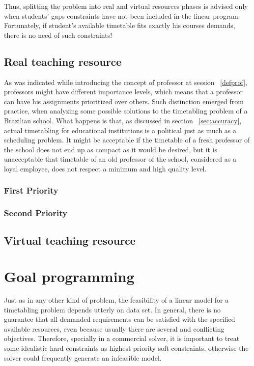 Thus, splitting the problem into real and virtual resources phases is advised only when students' gaps constraints have not been included in the linear program. Fortunately, if student's available timetable fits exactly his courses demands, there is no need of such constraints!


\subsection{Real teaching resource}

As was indicated while introducing the concept of professor at session ~\ref{defprof}, professors might have different importance levels, which means that a professor can have his assignments prioritized over others. Such distinction emerged from practice, when analyzing some possible solutions to the timetabling problem of a Brazilian school. What happens is that, as discussed in section ~\ref{sec:accuracy}, actual timetabling for educational institutions is a political just as much as a scheduling problem. It might be acceptable if the timetable of a fresh professor of the school does not end up as compact as it would be desired, but it is unacceptable that timetable of an old professor of the school, considered as a loyal employee, does not respect a minimum and high quality level.


\subsubsection{First Priority}

\subsubsection{Second Priority}


\subsection{Virtual teaching resource}




\section{Goal programming}

Just as in any other kind of problem, the feasibility of a linear model for a timetabling problem depends utterly on data set. In general, there is no guarantee that all demanded requirements can be satisfied with the specified available resources, even because usually there are several and conflicting objectives. Therefore, specially in a commercial solver, it is important to treat some idealistic hard constraints as highest priority soft constraints, otherwise the solver could frequently generate an infeasible model.

